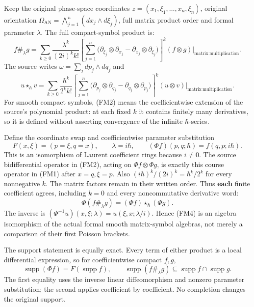 \documentclass[
  11pt,
]{article}
\begin{document}
Keep the original phase-space coordinates
\(z=(x_1,\xi_1,\ldots,x_n,\xi_n)\), original orientation
\(\Omega_{\mathrm{AN}}=\bigwedge_{j=1}^n(dx_j\wedge d\xi_j)\), full
matrix product order and formal parameter \(\lambda\). The full
compact-symbol product is: \[
 f\#_\lambda g
 =\sum_{k\ge0}\frac{\lambda^k}{(2i)^k k!}
  \left[
   \sum_{j=1}^n
    \bigl(\partial_{\xi_j}\otimes\partial_{x_j}
          -\partial_{x_j}\otimes\partial_{\xi_j}\bigr)
  \right]^k(f\otimes g)\big|_{\mathrm{matrix\ multiplication}}.
 \tag{FM1}
\] The source writes \(\omega=\sum_jdp_j\wedge dq_j\) and \[
 u\star_\hbar v
 =\sum_{k\ge0}\frac{\hbar^k}{2^k k!}
  \left[
   \sum_{j=1}^n
    \bigl(\partial_{p_j}\otimes\partial_{q_j}
          -\partial_{q_j}\otimes\partial_{p_j}\bigr)
  \right]^k(u\otimes v)\big|_{\mathrm{matrix\ multiplication}}.
 \tag{FM2}
\] For smooth compact symbols, (FM2) means the coefficientwise extension
of the source's polynomial product: at each fixed \(k\) it contains
finitely many derivatives, so it is defined without asserting
convergence of the infinite \(\hbar\)-series.

Define the coordinate swap and coefficientwise parameter substitution \[
 F(x,\xi)=(p=\xi,q=x),\qquad
 \lambda=i\hbar,\qquad
 (\Phi f)(p,q;\hbar)=f(q,p;i\hbar).
 \tag{FM3}
\] This is an isomorphism of Laurent coefficient rings because
\(i\ne0\). The source bidifferential operator in (FM2), acting on
\(\Phi f\otimes\Phi g\), is exactly this course operator in (FM1) after
\(x=q,\xi=p\). Also \((i\hbar)^k/(2i)^k=\hbar^k/2^k\) for every
nonnegative \(k\). The matrix factors remain in their written order.
Thus \textbf{each} finite coefficient agrees, including \(k=0\) and
every noncommutative derivative word: \[
 \Phi(f\#_\lambda g)
   =(\Phi f)\star_\hbar(\Phi g).
 \tag{FM4}
\] The inverse is \((\Phi^{-1}u)(x,\xi;\lambda)=u(\xi,x;\lambda/i)\).
Hence (FM4) is an algebra isomorphism of the actual formal smooth
matrix-symbol algebras, not merely a comparison of their first Poisson
brackets.

The support statement is equally exact. Every term of either product is
a local differential expression, so for coefficientwise compact \(f,g\),
\[
 \operatorname{supp}(\Phi f)=F(\operatorname{supp}f),\qquad
 \operatorname{supp}(f\#_\lambda g)
   \subseteq\operatorname{supp}f\cap\operatorname{supp}g .
 \tag{FM5}
\] The first equality uses the inverse linear diffeomorphism and nonzero
parameter substitution; the second applies coefficient by coefficient.
No completion changes the original support.
\end{document}
